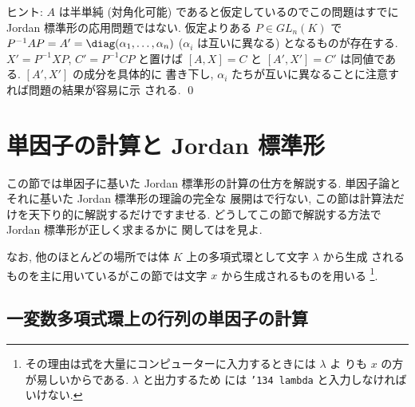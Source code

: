 \documentclass[12pt,twoside]{jarticle}
\begin{document}
\noindent
ヒント: $A$ は半単純 (対角化可能) であると仮定しているのでこの問題はすでに 
Jordan 標準形の応用問題ではない.  仮定よりある $P\in GL_n(K)$ 
で $P^{-1}AP=A'=\diag(\alpha_1,\dots,\alpha_n)$ ($\alpha_i$ は互いに異なる) 
となるものが存在する.  $X'=P^{-1}XP$, $C'=P^{-1}CP$ と置けば $[A,X]=C$ 
と $[A',X']=C'$ は同値である.  $[A',X']$ の成分を具体的に
書き下し, $\alpha_i$ たちが互いに異なることに注意すれば問題の結果が容易に示
される.
\qed


\section{単因子の計算と Jordan 標準形}
\label{sec:calc-elem-div-Jordan}

この節では単因子に基いた Jordan 標準形の計算の仕方を解説する.
単因子論とそれに基いた Jordan 標準形の理論の完全な
展開はで行ない, 
この節は計算法だけを天下り的に解説するだけですませる.
どうしてこの節で解説する方法で Jordan 標準形が正しく求まるかに
関してはを見よ.

なお, 他のほとんどの場所では体 $K$ 上の多項式環として文字 $\lambda$ から生成
されるものを主に用いているがこの節では文字 $x$ から生成されるものを用いる%
\footnote{その理由は式を大量にコンピューターに入力するときには $\lambda$ よ
  りも $x$ の方が易しいからである.  $\lambda$ と出力するため
  には {\tt\char'134 lambda} と入力しなければいけない.}.


\subsection{一変数多項式環上の行列の単因子の計算}
\label{sec:calc-elem-div}
\end{document}
